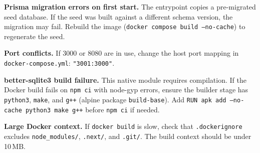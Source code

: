 \documentclass[11pt,letterpaper]{article}
\newcommand{\file}[1]{\texttt{#1}}
\newcommand{\cmd}[1]{\texttt{#1}}
\begin{document}
\textbf{Prisma migration errors on first start.} The entrypoint copies a pre-migrated seed database. If the seed was built against a different schema version, the migration may fail. Rebuild the image (\cmd{docker compose build --no-cache}) to regenerate the seed.

\textbf{Port conflicts.} If 3000 or 8080 are in use, change the host port mapping in \file{docker-compose.yml}: \cmd{"3001:3000"}.

\textbf{better-sqlite3 build failure.} This native module requires compilation. If the Docker build fails on \cmd{npm ci} with node-gyp errors, ensure the builder stage has \cmd{python3}, \cmd{make}, and \cmd{g++} (alpine package \cmd{build-base}). Add \cmd{RUN apk add --no-cache python3 make g++} before \cmd{npm ci} if needed.

\textbf{Large Docker context.} If \cmd{docker build} is slow, check that \file{.dockerignore} excludes \file{node\_modules/}, \file{.next/}, and \file{.git/}. The build context should be under 10\,MB.
\end{document}
